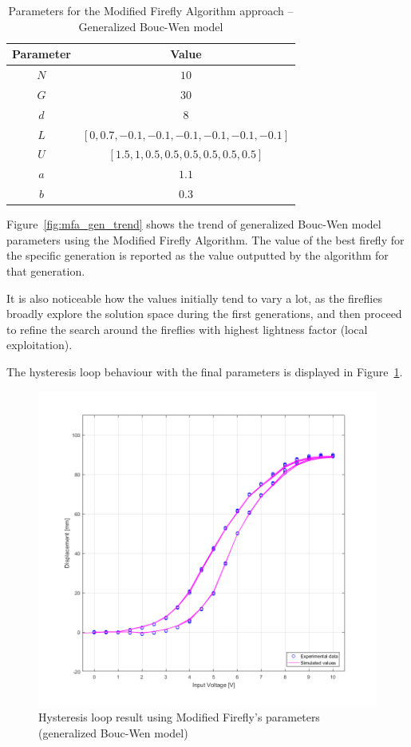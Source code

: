 \begin{table}[H]
	\centering
	\begin{tabular}{c c}
		\toprule
		\textbf{Parameter} & \textbf{Value} \\ \toprule
		$N$			& $10$ \\
		$G$			& $30$ \\
		$d$			& $8$  \\
		$L$			& $\left[0, 0.7, -0.1, -0.1, -0.1, -0.1, -0.1, -0.1\right]$ \\
		$U$			& $\left[1.5, 1, 0.5, 0.5, 0.5, 0.5, 0.5, 0.5\right]$ \\ 
		$a$			& $1.1$ \\
		$b$			& $0.3$ \\ \bottomrule
	\end{tabular}
	\caption{Parameters for the Modified Firefly Algorithm approach -- Generalized Bouc-Wen model}
	\label{tab:mfa_gen_params}
\end{table}

Figure~\ref{fig:mfa_gen_trend} shows the trend of generalized Bouc-Wen model
parameters using the Modified Firefly Algorithm. The value of the best firefly
for the specific generation is reported as the value outputted by the algorithm
for that generation.

It is also noticeable how the values initially tend to vary a lot,
as the fireflies broadly explore the solution space during the first generations,
and then proceed to refine the search around the fireflies
with highest lightness factor (local exploitation).

The hysteresis loop behaviour with the final parameters
is displayed in Figure~\ref{fig:mfa_gen_hys}.

\begin{figure}[H]
	\centering
	\includegraphics[width=0.9\linewidth]{Images/mfa_gen_final}
	\caption{Hysteresis loop result using Modified Firefly's parameters (generalized Bouc-Wen model)}
	\label{fig:mfa_gen_hys}
\end{figure}


